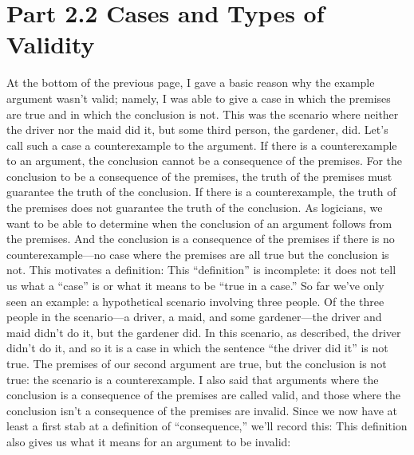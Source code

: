 \section{Part 2.2 Cases and Types of Validity}
At the bottom of the previous page, I gave a basic reason why the example argument wasn't valid; namely, I was able to give a case in which the premises are true and in which the conclusion is not. This was the scenario where neither the driver nor the maid did it, but some third person, the gardener, did. Let’s call such a case a counterexample to the argument. If there is a counterexample to an argument, the conclusion cannot be a consequence of the premises. For the conclusion to be a consequence of the premises, the truth of the premises must guarantee the truth of the conclusion. If there is a counterexample, the truth of the premises does not guarantee the truth of the conclusion. As logicians, we want to be able to determine when the conclusion of an argument follows from the premises. And the conclusion is a consequence of the premises if there is no counterexample—no case where the premises are all true but the conclusion is not. This motivates a definition:
This “definition” is incomplete: it does not tell us what a “case” is or what it means to be “true in a case.” So far we’ve only seen an example: a hypothetical scenario involving three people. Of the three people in the scenario—a driver, a maid, and some gardener—the driver and maid didn’t do it, but the gardener did. In this scenario, as described, the driver didn’t do it, and so it is a case in which the sentence “the driver did it” is not true. The premises of our second argument are true, but the conclusion is not true: the scenario is a counterexample. I also said that arguments where the conclusion is a consequence of the premises are called valid, and those where the conclusion isn’t a consequence of the premises are \gls{invalid}. Since we now have at least a first stab at a definition of “consequence,” we’ll record this:
This definition also gives us what it means for an argument to be invalid:
